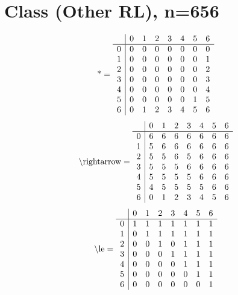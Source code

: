\documentclass[11pt]{article}
\begin{document}
\section{Class (Other RL), n=656}
\[\text{*} = 
\begin{array}{r | r r r r r r r}
 & 0 & 1 & 2 & 3 & 4 & 5 & 6 \\ \hline
0 & 0 & 0 & 0 & 0 & 0 & 0 & 0 \\
1 & 0 & 0 & 0 & 0 & 0 & 0 & 1 \\
2 & 0 & 0 & 0 & 0 & 0 & 0 & 2 \\
3 & 0 & 0 & 0 & 0 & 0 & 0 & 3 \\
4 & 0 & 0 & 0 & 0 & 0 & 0 & 4 \\
5 & 0 & 0 & 0 & 0 & 0 & 1 & 5 \\
6 & 0 & 1 & 2 & 3 & 4 & 5 & 6 \\
\end{array}
\]
\[\text{\textbackslash rightarrow} = 
\begin{array}{r | r r r r r r r}
 & 0 & 1 & 2 & 3 & 4 & 5 & 6 \\ \hline
0 & 6 & 6 & 6 & 6 & 6 & 6 & 6 \\
1 & 5 & 6 & 6 & 6 & 6 & 6 & 6 \\
2 & 5 & 5 & 6 & 5 & 6 & 6 & 6 \\
3 & 5 & 5 & 5 & 6 & 6 & 6 & 6 \\
4 & 5 & 5 & 5 & 5 & 6 & 6 & 6 \\
5 & 4 & 5 & 5 & 5 & 5 & 6 & 6 \\
6 & 0 & 1 & 2 & 3 & 4 & 5 & 6 \\
\end{array}
\]
\[\text{\textbackslash le} = 
\begin{array}{r | r r r r r r r}
 & 0 & 1 & 2 & 3 & 4 & 5 & 6 \\ \hline
0 & 1 & 1 & 1 & 1 & 1 & 1 & 1 \\
1 & 0 & 1 & 1 & 1 & 1 & 1 & 1 \\
2 & 0 & 0 & 1 & 0 & 1 & 1 & 1 \\
3 & 0 & 0 & 0 & 1 & 1 & 1 & 1 \\
4 & 0 & 0 & 0 & 0 & 1 & 1 & 1 \\
5 & 0 & 0 & 0 & 0 & 0 & 1 & 1 \\
6 & 0 & 0 & 0 & 0 & 0 & 0 & 1 \\
\end{array}
\]
\end{document}
